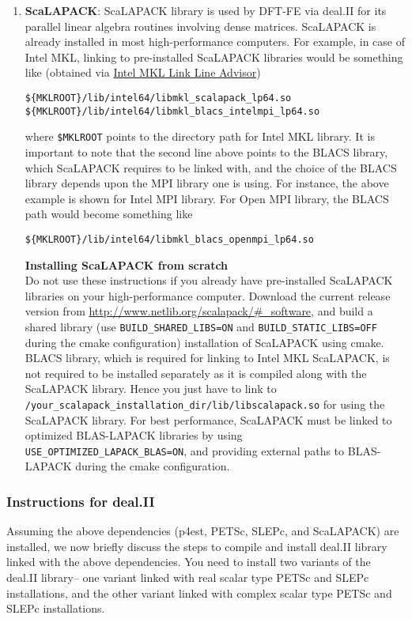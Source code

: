 \begin{enumerate}
\item {\bf ScaLAPACK}: ScaLAPACK library is used by DFT-FE via deal.II for its parallel linear algebra routines involving dense matrices. ScaLAPACK is already installed in most high-performance computers. For example, in case of Intel MKL, linking to pre-installed ScaLAPACK libraries would be something like (obtained via \href{https://software.intel.com/en-us/articles/intel-mkl-link-line-advisor}{Intel MKL Link Line Advisor})
\begin{verbatim}
${MKLROOT}/lib/intel64/libmkl_scalapack_lp64.so
${MKLROOT}/lib/intel64/libmkl_blacs_intelmpi_lp64.so
\end{verbatim}
where \verb|$MKLROOT| points to the directory path for Intel MKL library. It is important to note that the second line above points to the BLACS library, which ScaLAPACK requires to be linked with, and the choice of the BLACS library depends upon the MPI library one is using. For instance, the above example is shown for Intel MPI library. For Open MPI library, the BLACS path would become something like
\begin{verbatim}
${MKLROOT}/lib/intel64/libmkl_blacs_openmpi_lp64.so
\end{verbatim}

{\bf Installing ScaLAPACK from scratch}\\
Do not use these instructions if you already have pre-installed ScaLAPACK libraries on your high-performance computer.
Download the current release version from \url{http://www.netlib.org/scalapack/#\_software}, and build a shared library (use \verb|BUILD_SHARED_LIBS=ON| and \verb|BUILD_STATIC_LIBS=OFF|  during the cmake configuration) installation of ScaLAPACK using cmake. BLACS library, which is required for linking to Intel MKL ScaLAPACK, is not required to be installed separately as it is compiled along with the ScaLAPACK library. Hence you just have to link to\\ \verb|/your_scalapack_installation_dir/lib/libscalapack.so| for using the ScaLAPACK library. For best performance, ScaLAPACK must be linked to optimized BLAS-LAPACK libraries by using\\ \verb|USE_OPTIMIZED_LAPACK_BLAS=ON|, and providing external paths to BLAS-LAPACK during the cmake configuration.   	
\end{enumerate}

\subsubsection{Instructions for deal.II}
Assuming the above dependencies (p4est, PETSc, SLEPc, and ScaLAPACK) are installed, we now briefly discuss the steps to compile and install deal.II library linked with the above dependencies. You need to install two variants of the deal.II library-- one variant linked with real scalar type PETSc and SLEPc installations, and the other variant linked with complex scalar type PETSc and SLEPc installations. 

